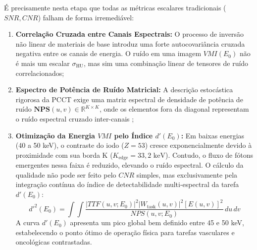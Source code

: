 \documentclass[
  12pt,
  a4paper,
  oneside
]{report}
\begin{document}
É precisamente nesta etapa que todas as métricas escalares tradicionais ($SNR, CNR$) falham de forma irremediável:
\begin{enumerate}
  \item \textbf{Correlação Cruzada entre Canais Espectrais:} O processo de inversão não linear de materiais de base introduz uma forte autocovariância cruzada negativa entre os canais de energia. O ruído em uma imagem $VMI(E_0)$ não é mais um escalar $\sigma_{\text{HU}}$, mas sim uma combinação linear de tensores de ruído correlacionados;
  \item \textbf{Espectro de Potência de Ruído Matricial:} A descrição estocástica rigorosa da PCCT exige uma matriz espectral de densidade de potência de ruído $\mathbf{NPS}(u, v) \in \mathbb{R}^{K \times K}$, onde os elementos fora da diagonal representam o ruído espectral cruzado inter-canais \cite{pimenta2026};
  \item \textbf{Otimização da Energia $VMI$ pelo Índice $d'(E_0)$:} Em baixas energias (40 a 50 keV), o contraste do iodo ($Z=53$) cresce exponencialmente devido à proximidade com sua borda K ($K_{\text{edge}} = 33{,}2\text{ keV}$). Contudo, o fluxo de fótons emergentes nessa faixa é reduzido, elevando o ruído espectral. O cálculo da qualidade não pode ser feito pelo $CNR$ simples, mas exclusivamente pela integração contínua do índice de detectabilidade multi-espectral da tarefa $d'(E_0)$:
  \begin{equation}
    d'^2(E_0) = \int \int \frac{\left| TTF(u, v; E_0) \right|^2 \left| W_{\text{task}}(u, v) \right|^2 \left[ E(u, v) \right]^2}{NPS(u, v; E_0)} \, du \, dv
    \label{eq:dprime_vmi_spectral}
  \end{equation}
  A curva $d'(E_0)$ apresenta um pico global bem definido entre 45 e 50 keV, estabelecendo o ponto ótimo de operação física para tarefas vasculares e oncológicas contrastadas.
\end{enumerate}
\end{document}
